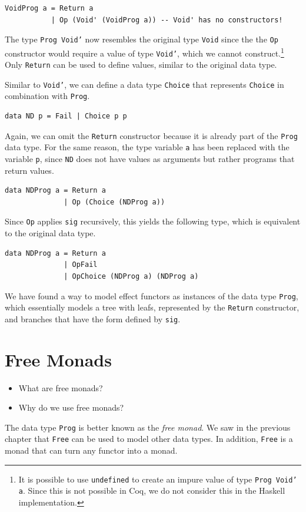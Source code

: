 \documentclass[a4paper, 11pt, fleqn, twoside]{scrreprt}
\newcommand{\todo}[1]{\marginpar{\textbf{TODO:} #1}}
\newcommand{\hinl}[1]{\texttt{#1}}
\begin{document}
\begin{verbatim}
VoidProg a = Return a
           | Op (Void' (VoidProg a)) -- Void' has no constructors!
\end{verbatim}

The type \hinl{Prog Void'} now resembles the original type  \hinl{Void} since 
the the \hinl{Op} constructor  would require a value of type \hinl{Void'}, 
which we cannot  construct.\footnote{It is possible to use \hinl{undefined} to 
create an impure value of type \hinl{Prog Void' a}. Since this  is not possible 
in Coq, we do not consider this in the Haskell implementation.} Only 
\hinl{Return} can be used to define values, similar to the  original data type.

Similar to \hinl{Void'}, we can define a data type  \hinl{Choice} that 
represents \hinl{Choice} in combination with \hinl{Prog}. 

\begin{verbatim}
data ND p = Fail | Choice p p
\end{verbatim}

Again, we can omit the \hinl{Return} constructor because it is  already part of 
the \hinl{Prog} data type. For the same reason,  the type variable \hinl{a} has 
been replaced with the variable \hinl{p}, since \hinl{ND} does not have  
values as arguments but rather programs that return values.

\begin{verbatim}
data NDProg a = Return a
              | Op (Choice (NDProg a))
\end{verbatim}

Since \hinl{Op} applies \hinl{sig} recursively,  this yields the following 
type, which is equivalent to the original data type.

\begin{verbatim}
data NDProg a = Return a
              | OpFail
              | OpChoice (NDProg a) (NDProg a)
\end{verbatim}

We have found a way to model effect functors as instances of the data type 
\hinl{Prog}, which essentially models a tree with leafs,  represented by the 
\hinl{Return} constructor, and branches that have the form defined by 
\hinl{sig}. \todo{Tree structure visualization?}

\section{Free Monads}
\begin{itemize}
\item What are free monads?
\item Why do we use free monads?
\end{itemize}
The data type \hinl{Prog} is better known as the \textit{free 
monad}. We saw in the previous chapter that \hinl{Free} can be 
used to model other data types. In addition, \hinl{Free} is a 
monad that can turn any functor into a monad.
\end{document}
